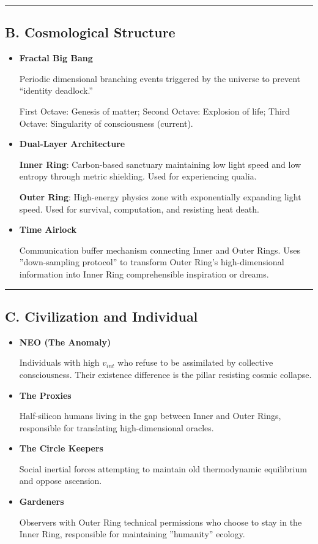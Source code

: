 \hrule

\subsection{B. Cosmological Structure}

\begin{itemize}
\item \textbf{Fractal Big Bang}

    Periodic dimensional branching events triggered by the universe to prevent ``identity deadlock.''

    First Octave: Genesis of matter; Second Octave: Explosion of life; Third Octave: Singularity of consciousness (current).

\item \textbf{Dual-Layer Architecture}

    \textbf{Inner Ring}: Carbon-based sanctuary maintaining low light speed and low entropy through metric shielding. Used for experiencing qualia.

    \textbf{Outer Ring}: High-energy physics zone with exponentially expanding light speed. Used for survival, computation, and resisting heat death.

\item \textbf{Time Airlock}

    Communication buffer mechanism connecting Inner and Outer Rings. Uses ''down-sampling protocol'' to transform Outer Ring's high-dimensional information into Inner Ring comprehensible inspiration or dreams.
\end{itemize}

\hrule

\subsection{C. Civilization and Individual}

\begin{itemize}
\item \textbf{NEO (The Anomaly)}

    Individuals with high $v_{int}$ who refuse to be assimilated by collective consciousness. Their existence difference is the pillar resisting cosmic collapse.

\item \textbf{The Proxies}

    Half-silicon humans living in the gap between Inner and Outer Rings, responsible for translating high-dimensional oracles.

\item \textbf{The Circle Keepers}

    Social inertial forces attempting to maintain old thermodynamic equilibrium and oppose ascension.

\item \textbf{Gardeners}

    Observers with Outer Ring technical permissions who choose to stay in the Inner Ring, responsible for maintaining ''humanity'' ecology.
\end{itemize}

